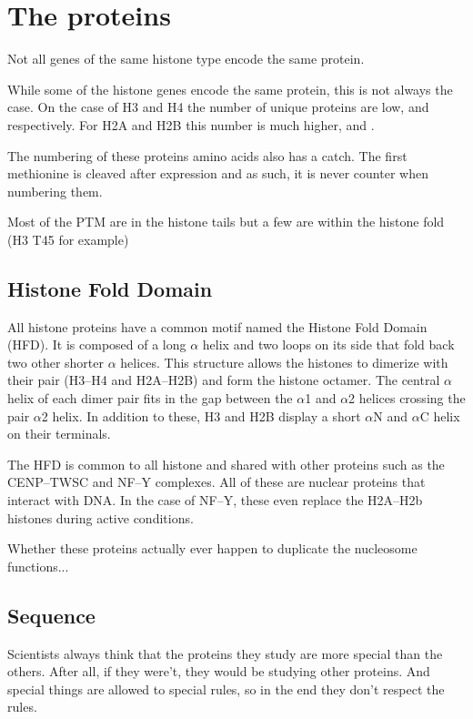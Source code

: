 \section{The proteins}

  Not all genes of the same histone type encode the same protein.

  While some of the histone genes encode the same protein, this is not always the
  case. On the case of H3 and H4 the number of unique proteins are low, \HThreeUniqueProteins{}
  and \HFourUniqueProteins{} respectively. For H2A and H2B this number is much higher, \HTwoAUniqueProteins{}
  and \HTwoBUniqueProteins{}.

  The numbering of these proteins amino acids also has a catch. The first methionine
  is cleaved after expression and as such, it is never counter when numbering them.

  Most of the PTM are in the histone tails but a few are within the histone fold (H3 T45 for example)

  \subsection{Histone Fold Domain}

    All histone proteins have a common motif named the Histone Fold Domain (HFD).
    It is composed of a long $\alpha$ helix and two loops on its side that fold
    back two other shorter $\alpha$ helices. This structure allows the histones
    to dimerize with their pair (H3--H4 and H2A--H2B) and form the histone
    octamer. The central $\alpha$ helix of each dimer pair fits in the gap between
    the $\alpha$1 and $\alpha$2 helices crossing the pair $\alpha$2 helix. In
    addition to these, H3 and H2B display a short $\alpha$N and $\alpha$C helix
    on their terminals.

    The HFD is common to all histone and shared with other
    proteins such as the CENP--TWSC and NF--Y complexes. All of these are nuclear
    proteins that interact with DNA. In the case of NF--Y, these even replace
    the H2A--H2b histones during active conditions.

    Whether these proteins actually ever happen to duplicate the nucleosome functions...

  \subsection{Sequence}
    Scientists always think that the proteins they study are more special than
    the others. After all, if they were't, they would be studying other proteins.
    And special things are allowed to special rules, so in the end they don't
    respect the rules.

